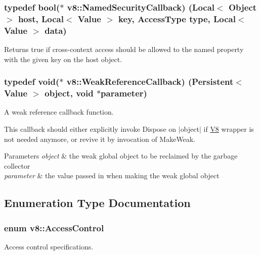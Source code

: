 \subsubsection[{Named\+Security\+Callback}]{\setlength{\rightskip}{0pt plus 5cm}typedef bool($\ast$ v8\+::\+Named\+Security\+Callback) ({\bf Local}$<$ {\bf Object} $>$ host, {\bf Local}$<$ {\bf Value} $>$ key, {\bf Access\+Type} type, {\bf Local}$<$ {\bf Value} $>$ data)}\label{namespacev8_ab5cafda0c556bba990c660ce9c904e0d}
Returns true if cross-\/context access should be allowed to the named property with the given key on the host object. \hypertarget{namespacev8_a4d5db775dbc002b23f1b55ec7ce80ea5}{}
\subsubsection[{Weak\+Reference\+Callback}]{\setlength{\rightskip}{0pt plus 5cm}typedef void($\ast$ v8\+::\+Weak\+Reference\+Callback) ({\bf Persistent}$<$ {\bf Value} $>$ object, void $\ast$parameter)}\label{namespacev8_a4d5db775dbc002b23f1b55ec7ce80ea5}
A weak reference callback function.

This callback should either explicitly invoke Dispose on $\vert$object$\vert$ if \hyperlink{classv8_1_1_v8}{V8} wrapper is not needed anymore, or \textquotesingle{}revive\textquotesingle{} it by invocation of Make\+Weak.


\begin{DoxyParams}{Parameters}
{\em object} & the weak global object to be reclaimed by the garbage collector \\
\hline
{\em parameter} & the value passed in when making the weak global object \\
\hline
\end{DoxyParams}


\subsection{Enumeration Type Documentation}
\hypertarget{namespacev8_a31d8355cb043d7d2dda3f4a52760b64e}{}
\subsubsection[{Access\+Control}]{\setlength{\rightskip}{0pt plus 5cm}enum {\bf v8\+::\+Access\+Control}}\label{namespacev8_a31d8355cb043d7d2dda3f4a52760b64e}
Access control specifications.

